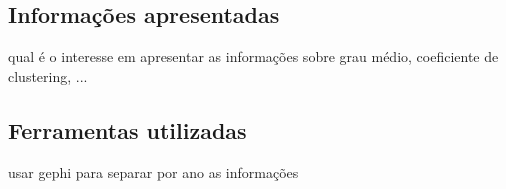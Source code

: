 \subsection{Informações apresentadas}
\label{subsecao_infos_apresentadas}

qual é o interesse em apresentar as informações sobre grau médio, coeficiente de clustering, ...        

\subsection{Ferramentas utilizadas}
\label{subsecao_ferramentas}

usar gephi para separar por ano as informações

